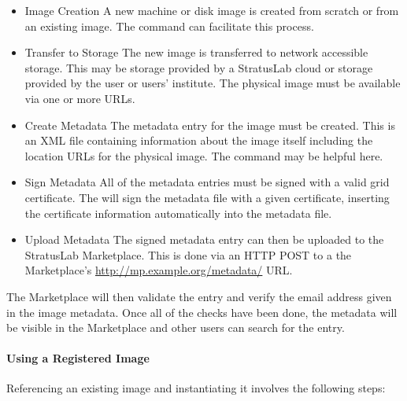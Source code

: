 \begin{itemize}

\item{Image Creation} A new machine or disk image is created from
  scratch or from an existing image.  The 
  command can facilitate this process.

\item{Transfer to Storage} The new image is transferred to network
  accessible storage.  This may be storage provided by a StratusLab
  cloud or storage provided by the user or users' institute.  The
  physical image must be available via one or more URLs\@.

\item{Create Metadata} The metadata entry for the image must be
  created.  This is an XML file containing information about the image
  itself including the location URLs for the physical image.  The
   command may be helpful here.

\item{Sign Metadata} All of the metadata entries must be signed with a
  valid grid certificate.  The  will sign
  the metadata file with a given certificate, inserting the
  certificate information automatically into the metadata file.

\item{Upload Metadata} The signed metadata entry can then be uploaded
  to the StratusLab Marketplace\@.  This is done via an HTTP POST to a
  the Marketplace's \url{http://mp.example.org/metadata/} URL\@.

\end{itemize}

The Marketplace will then validate the entry and verify the email
address given in the image metadata.  Once all of the checks have been
done, the metadata will be visible in the Marketplace and other users
can search for the entry.

\paragraph{Using a Registered Image}

Referencing an existing image and instantiating it involves the
following steps:

